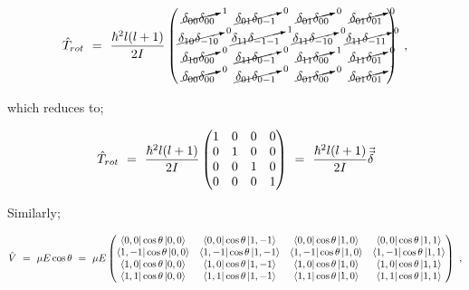 \documentclass{article}
\begin{document}
\begin{equation} \label{eb-eq-267-1}
\hat{T}_{rot} \hspace{0.125cm} = \hspace{0.125cm} \frac{\hbar^2 l(l + 1)}{2I} \begin{pmatrix} \cancelto{1}{\delta_{00}\delta_{00}} & \cancelto{0}{\delta_{01}\delta_{0 -1}} & \cancelto{0}{\delta_{01}\delta_{00}} & \cancelto{0}{\delta_{01}\delta_{01}} \\ \cancelto{0}{\delta_{10}\delta_{-1 0}} & \cancelto{1}{\delta_{11}\delta_{-1 -1}} & \cancelto{0}{\delta_{11}\delta_{-10}} & \cancelto{0}{\delta_{11}\delta_{-11}} \\ \cancelto{0}{\delta_{10}\delta_{00}} & \cancelto{0}{\delta_{11}\delta_{0 -1}} & \cancelto{1}{\delta_{11}\delta_{00}} & \cancelto{0}{\delta_{11}\delta_{01}} \\ \cancelto{0}{\delta_{00}\delta_{00}} & \cancelto{0}{\delta_{01}\delta_{0 -1}} & \cancelto{0}{\delta_{01}\delta_{00}} & \cancelto{1}{\delta_{01}\delta_{01}}  \end{pmatrix} \hspace{0.125cm},
\end{equation} 

which reduces to; 

\begin{equation} \label{eb-eq-268-1}
\hat{T}_{rot} \hspace{0.125cm} = \hspace{0.125cm} \frac{\hbar^2 l(l + 1)}{2I} \begin{pmatrix} 1 & 0 & 0 & 0 \\ 0 & 1 & 0 & 0 \\ 0 & 0 & 1 & 0 \\ 0 & 0 & 0 & 1
\end{pmatrix} \hspace{0.125cm} = \hspace{0.125cm} \frac{\hbar^2 l(l + 1)}{2I}\vec{\vec{\delta}}
\end{equation} 

Similarly; 

\begin{equation} \label{eb-eq-269-1}
\hat{V} \hspace{0.125cm} = \hspace{0.125cm} \mu E \cos\theta \hspace{0.125cm} = \hspace{0.125cm} \mu E \begin{pmatrix} \bra{0,0}\cos\theta\ket{0,0} & \bra{0,0}\cos\theta\ket{1,-1} & \bra{0,0}\cos\theta\ket{1,0} & \bra{0,0}\cos\theta\ket{1,1} \\ \bra{1,-1}\cos\theta\ket{0,0} & \bra{1,-1}\cos\theta\ket{1,-1} & \bra{1,-1}\cos\theta\ket{1,0} & \bra{1,-1}\cos\theta\ket{1,1} \\ \bra{1,0}\cos\theta\ket{0,0} & \bra{1,0}\cos\theta\ket{1,-1} & \bra{1,0}\cos\theta\ket{1,0} & \bra{1,0}\cos\theta\ket{1,1} \\ \bra{1,1}\cos\theta\ket{0,0} & \bra{1,1}\cos\theta\ket{1,-1} & \bra{1,1}\cos\theta\ket{1,0} & \bra{1,1}\cos\theta\ket{1,1}
\end{pmatrix} \hspace{0.125cm} ,
\end{equation} 
\end{document}
